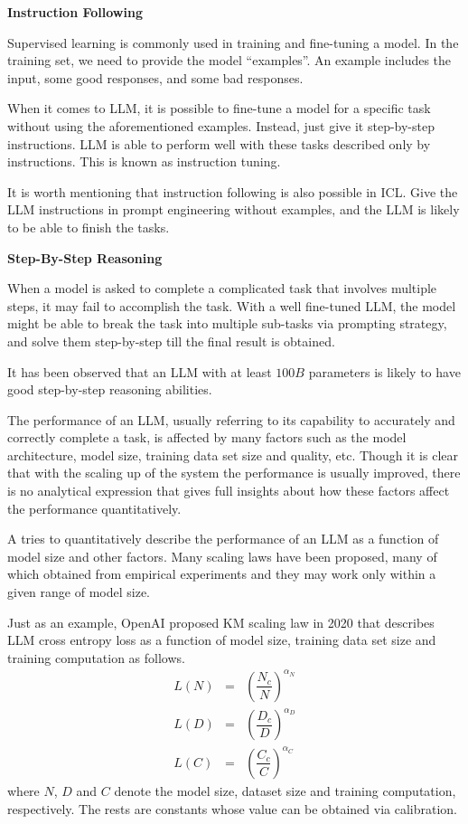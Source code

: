 \vspace{0.1in}
\noindent \textbf{Instruction Following}
\vspace{0.1in}

Supervised learning is commonly used in training and fine-tuning a model. In the training set, we need to provide the model ``examples''. An example includes the input, some good responses, and some bad responses. 

When it comes to LLM, it is possible to fine-tune a model for a specific task without using the aforementioned examples. Instead, just give it step-by-step instructions. LLM is able to perform well with these tasks described only by instructions. This is known as instruction tuning.

It is worth mentioning that instruction following is also possible in ICL. Give the LLM instructions in prompt engineering without examples, and the LLM is likely to be able to finish the tasks.

\vspace{0.1in}
\noindent \textbf{Step-By-Step Reasoning}
\vspace{0.1in}

When a model is asked to complete a complicated task that involves multiple steps, it may fail to accomplish the task. With a well fine-tuned LLM, the model might be able to break the task into multiple sub-tasks via  prompting strategy, and solve them step-by-step till the final result is obtained.

It has been observed that an LLM with at least $100B$ parameters is likely to have good step-by-step reasoning abilities.

The performance of an LLM, usually referring to its capability to accurately and correctly complete a task, is affected by many factors such as the model architecture, model size, training data set size and quality, etc. Though it is clear that with the scaling up of the system the performance is usually improved, there is no analytical expression that gives full insights about how these factors affect the performance quantitatively.

A  tries to quantitatively describe the performance of an LLM as a function of model size and other factors. Many scaling laws have been proposed, many of which obtained from empirical experiments and they may work only within a given range of model size.

Just as an example, OpenAI proposed KM scaling law in 2020 that describes LLM cross entropy loss as a function of model size, training data set size and training computation as follows.
\begin{eqnarray}
	L(N) &=& \left(\dfrac{N_c}{N}\right)^{\alpha_N} \nonumber \\
	L(D) &=& \left(\dfrac{D_c}{D}\right)^{\alpha_D} \nonumber \\
	L(C) &=& \left(\dfrac{C_c}{C}\right)^{\alpha_C} \nonumber
\end{eqnarray}
where $N$, $D$ and $C$ denote the model size, dataset size and training computation, respectively. The rests are constants whose value can be obtained via calibration.

